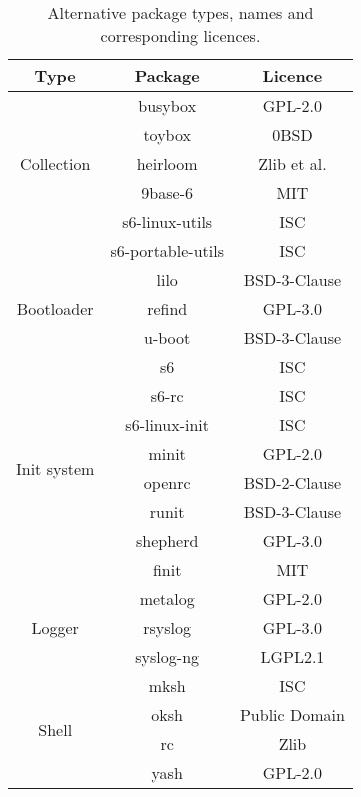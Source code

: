 \begin{table}[!ht]
    \centering
    \begin{tabular}{|c|c|c|}
        \hline
        Type & Package & Licence \\
        \hline
        \hline
        \multirow{5}{*}{Collection} & busybox \cite{busybox} & GPL-2.0 \\
        \cline{2-3}
        & toybox \cite{toybox} & 0BSD \\
        \cline{2-3}
        & heirloom \cite{heirloom} & Zlib et al. \footnotemark\\
        \cline{2-3}
        & 9base-6 \cite{9base} & MIT \\
        \cline{2-3}
        & s6-linux-utils \cite{s6-linux} & ISC \\
        \cline{2-3}
        & s6-portable-utils \cite{s6-portable} & ISC \\
        \hline
        \multirow{3}{*}{Bootloader} & lilo \cite{lilo} & BSD-3-Clause \\
        \cline{2-3}
        & refind \cite{refind} & GPL-3.0 \\
        \cline{2-3}
        & u-boot \cite{uboot} & BSD-3-Clause \\
        \hline
        \multirow{8}{*}{Init system} & s6 \cite{s6} & ISC \\
        \cline{2-3}
        & s6-rc \cite{s6-rc} & ISC \\
        \cline{2-3}
        & s6-linux-init \cite{s6-linux-init} & ISC \\
        \cline{2-3}
        & minit \cite{minit} & GPL-2.0 \\
        \cline{2-3}
        & openrc \cite{openrc} & BSD-2-Clause \\
        \cline{2-3}
        & runit \cite{runit} & BSD-3-Clause \\
        \cline{2-3}
        & shepherd \cite{shepherd} & GPL-3.0 \\
        \cline{2-3}
        & finit \cite{finit} & MIT \\
        \hline
        \multirow{3}{*}{Logger} & metalog \cite{metalog} & GPL-2.0 \\
        \cline{2-3}
        & rsyslog \cite{rsyslog} & GPL-3.0 \\
        \cline{2-3}
        & syslog-ng \cite{syslog-ng} & LGPL2.1 \\
        \hline
        \multirow{4}{*}{Shell} & mksh \cite{mksh} & ISC \\
        \cline{2-3}
        & oksh \cite{oksh} & Public Domain \\
        \cline{2-3}
        & rc \cite{rc} & Zlib \\
        \cline{2-3}
        & yash \cite{yash} & GPL-2.0 \\
        \hline
    \end{tabular}
    \caption{Alternative package types, names and corresponding licences.}
\end{table}

